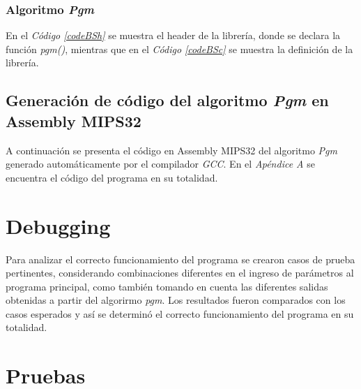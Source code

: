 \documentclass{article}
\newcommand{\refcode}[1]{\textit{Código \ref{#1}}}
\begin{document}
\subsubsection{Algoritmo \textit{Pgm}}

	En el \refcode{codeBSh} se muestra el header de la librería, donde se declara la función \textit{pgm()}, mientras que en el \refcode{codeBSc} se muestra la definición de la librería.

% 


% 




\subsection{Generación de código del algoritmo \textit{Pgm} en Assembly MIPS32}

	A continuación se presenta el código en Assembly MIPS32 del algoritmo \textit{Pgm} generado automáticamente por el compilador \textit{GCC}. En el \textit{Apéndice A}	 se encuentra el código del programa en su totalidad.
	\medskip

% 



\section{Debugging}
	
	Para analizar el correcto funcionamiento del programa se crearon casos de prueba pertinentes, considerando combinaciones diferentes en el ingreso de parámetros al programa principal, como también tomando en cuenta las diferentes salidas obtenidas a partir del algorirmo \textit{pgm}. Los resultados fueron comparados con los casos esperados y así se determinó el correcto funcionamiento del programa en su totalidad.
\bigskip\bigskip




\section{Pruebas}
\end{document}

